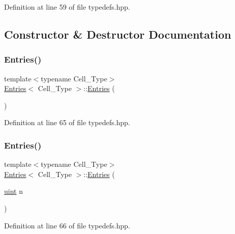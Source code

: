 Definition at line 59 of file typedefs.\+hpp.



\subsection{Constructor \& Destructor Documentation}
\mbox{\label{class_entries_a9e6cba5965f285beb3c0356c79f592d2}} 
\subsubsection{\texorpdfstring{Entries()}{Entries()}\hspace{0.1cm}{\footnotesize\ttfamily [1/2]}}
{\footnotesize\ttfamily template$<$typename Cell\+\_\+\+Type$>$ \\
\hyperlink{class_entries}{Entries}$<$ Cell\+\_\+\+Type $>$\+::\hyperlink{class_entries}{Entries} (\begin{DoxyParamCaption}{ }\end{DoxyParamCaption})\hspace{0.3cm}{\ttfamily [inline]}}



Definition at line 65 of file typedefs.\+hpp.

\mbox{\label{class_entries_a03249234a765e3363ae89dba76b3ff9f}} 
\subsubsection{\texorpdfstring{Entries()}{Entries()}\hspace{0.1cm}{\footnotesize\ttfamily [2/2]}}
{\footnotesize\ttfamily template$<$typename Cell\+\_\+\+Type$>$ \\
\hyperlink{class_entries}{Entries}$<$ Cell\+\_\+\+Type $>$\+::\hyperlink{class_entries}{Entries} (\begin{DoxyParamCaption}\item[{\hyperlink{typedefs_8hpp_a91ad9478d81a7aaf2593e8d9c3d06a14}{uint}}]{n }\end{DoxyParamCaption})\hspace{0.3cm}{\ttfamily [inline]}}



Definition at line 66 of file typedefs.\+hpp.

